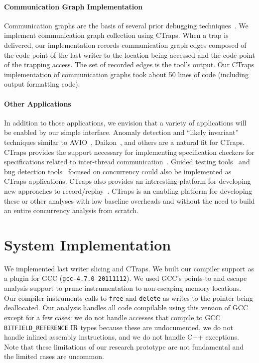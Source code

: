 \documentclass[preprint,9pt]{sigplanconf}
\newcommand{\ctraps}{CTraps\xspace}
\begin{document}
\paragraph{Communication Graph Implementation}
Communication graphs are the basis of several prior debugging
techniques~\cite{recon, bugaboo, defuse}.  We implement communication graph
collection using \ctraps.  When a trap is delivered, our implementation records
communication graph edges composed of the code point of the last writer to the
location being accessed and the code point of the trapping access.  The set of
recorded edges is the tool's output.  Our \ctraps implementation of
communication graphs took about 50 lines of code (including output formatting
code). 

\paragraph{Other Applications}
In addition to those applications, we envision that a variety of applications
will be enabled by our simple interface.  Anomaly detection and ``likely
invariant'' techniques similar to AVIO~\cite{avio}, Daikon~\cite{daikon}, and
others are a natural fit for \ctraps.  \ctraps provides the support necessary
for implementing specification checkers for specifications related to
inter-thread communication~\cite{velodrome,oshajava}.  Guided testing
tools~\cite{cuzz,chess} and bug detection tools~\cite{ctrigger} focused on
concurrency could also be implemented as \ctraps applications.  \ctraps also
provides an interesting platform for developing new approaches to
record/replay~\cite{chimera,fdr}.  \ctraps is an enabling platform for
developing these or other analyses with low baseline overheads and without the
need to build an entire concurrency analysis from scratch.

\section{System Implementation}

We implemented last writer slicing and \ctraps.  We built our compiler support
as a plugin for GCC ({\tt gcc-4.7.0 20111112}).  We used GCC's points-to and
escape analysis support to prune instrumentation to non-escaping memory
locations.  Our compiler instruments calls to {\tt free} and {\tt delete} as
writes to the pointer being deallocated.  Our analysis handles all code
compilable using this version of GCC except for a few cases: we do not handle
accesses that compile to GCC {\tt BITFIELD\_REFERENCE} IR types because these
are undocumented, we do not handle inlined assembly instructions, and we do not
handle C++ exceptions.  Note that these limitations of our research prototype
are not fundamental and the limited cases are uncommon.   
\end{document}
